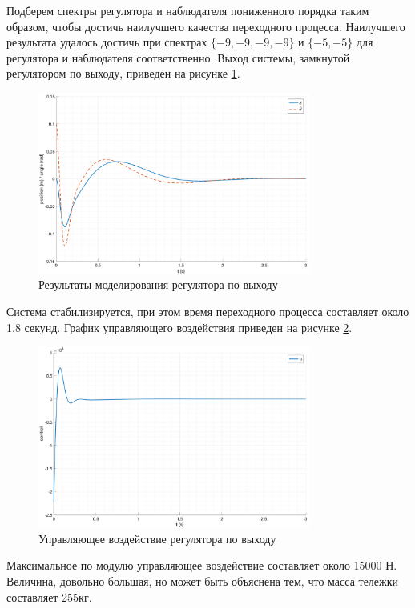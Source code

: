 Подберем спектры регулятора и наблюдателя пониженного порядка таким образом, чтобы 
достичь наилучшего качества переходного процесса. Наилучшего результата удалось достичь при
спектрах $\{-9, -9, -9, -9\}$ и $\{-5, -5\}$ для регулятора и наблюдателя соответственно. 
Выход системы, замкнутой регулятором по выходу, приведен на рисунке \ref{fig:modal_controller_obderver_out}.
\begin{figure}[ht!]
    \centering
    \includegraphics[width=0.8\textwidth]{media/plots/observer_controller/observer_controller_out.png}
    \caption{Результаты моделирования регулятора по выходу}
    \label{fig:modal_controller_obderver_out}
\end{figure}

Система стабилизируется, при этом время переходного процесса составляет около 1.8 секунд. 
График управляющего воздействия приведен на рисунке \ref{fig:modal_controller_obderver_u}.
\begin{figure}[ht!]
    \centering
    \includegraphics[width=0.8\textwidth]{media/plots/observer_controller/observer_controller_u.png}
    \caption{Управляющее воздействие регулятора по выходу}
    \label{fig:modal_controller_obderver_u}
\end{figure}
Максимальное по модулю управляющее воздействие составляет около 15000 Н. Величина, довольно большая, 
но может быть объяснена тем, что масса тележки составляет 255кг. 

